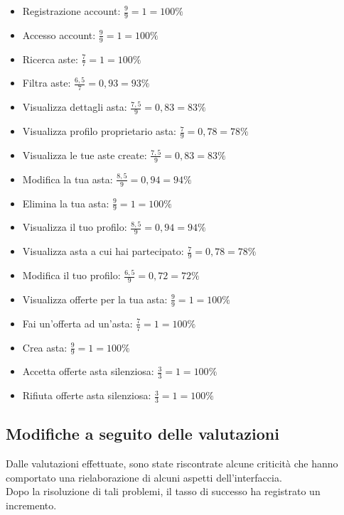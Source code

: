             \begin{itemize}
                \item Registrazione account: $\frac{9}{9} = 1 = 100\%$
                \item Accesso account: $\frac{9}{9} = 1 = 100\%$
                \item Ricerca aste: $\frac{7}{7} = 1 = 100\%$
                \item Filtra aste: $\frac{6,5}{7} = 0,93 = 93\%$
                \item Visualizza dettagli asta: $\frac{7,5}{9} = 0,83 = 83\%$
                \item Visualizza profilo proprietario asta: $\frac{7}{9} = 0,78 = 78\%$
                \item Visualizza le tue aste create: $\frac{7,5}{9} = 0,83 = 83\%$
                \item Modifica la tua asta: $\frac{8,5}{9} = 0,94 = 94\%$
                \item Elimina la tua asta: $\frac{9}{9} = 1 = 100\%$
                \item Visualizza il tuo profilo: $\frac{8,5}{9} = 0,94 = 94\%$
                \item Visualizza asta a cui hai partecipato: $\frac{7}{9} = 0,78 = 78\%$
                \item Modifica il tuo profilo: $\frac{6,5}{9} = 0,72 = 72\%$
                \item Visualizza offerte per la tua asta: $\frac{9}{9} = 1 = 100\%$
                \item Fai un'offerta ad un'asta: $\frac{7}{7} = 1 = 100\%$
                \item Crea asta: $\frac{9}{9} = 1 = 100\%$
                \item Accetta offerte asta silenziosa: $\frac{3}{3} = 1 = 100\%$
                \item Rifiuta offerte asta silenziosa: $\frac{3}{3} = 1 = 100\%$
            \end{itemize}
        
        \subsection{Modifiche a seguito delle valutazioni}
            Dalle valutazioni effettuate, sono state riscontrate alcune criticità che hanno comportato una rielaborazione di alcuni aspetti dell’interfaccia. \\
            Dopo la risoluzione di tali problemi, il tasso di successo ha registrato un incremento.

